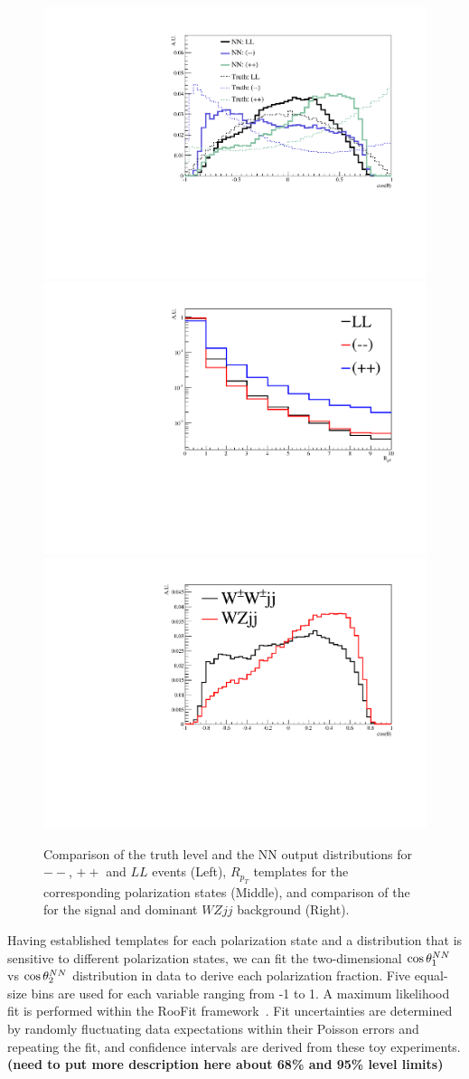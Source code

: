 \begin{figure}
\includegraphics[width=.32\textwidth]{./fig/1d_templates_graph_X.pdf}
\includegraphics[width=.32\textwidth]{./fig/ratios_LLRROO_graph.pdf}
\includegraphics[width=.32\textwidth]{./fig/1d_wz_bg_graph_X.pdf}
\caption{\label{fig:polarization_comparison} Comparison of the truth level \cts and the 
NN output \ctsNN distributions for $--$, $++$ and $LL$ events (Left), 
$R_{p_T}$ templates for the corresponding polarization states (Middle), 
and comparison of the \ctsNN for the signal and dominant $WZjj$ background (Right).}
\end{figure}

Having established templates for each polarization state and a
distribution that is sensitive to different polarization states, 
we can fit the two-dimensional $ \cos \theta^{NN}  _1$ vs $ \cos \theta^{NN}  _2$
distribution in data to derive each polarization fraction. Five equal-size bins 
are used for each \ctsNN variable ranging from -1 to 1. A maximum likelihood fit is performed 
within the RooFit framework~\cite{aa}. Fit uncertainties are determined by randomly
fluctuating data expectations within their Poisson errors and
repeating the fit, and confidence intervals are derived from these toy experiments.  
{\bf (need to put more description here about 68\% and 95\% level limits)}

